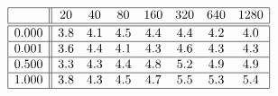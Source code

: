 \[
\begin{array}{|c||ccccccc|}
\hline 
& 20 & 40 & 80 & 160 & 320 & 640 & 1280\\
\hline \hline 
0.000 & 3.8 & 4.1 & 4.5 & 4.4 & 4.4 & 4.2 & 4.0 \\ \hline 
0.001 & 3.6 & 4.4 & 4.1 & 4.3 & 4.6 & 4.3 & 4.3 \\ \hline 
0.500 & 3.3 & 4.3 & 4.4 & 4.8 & 5.2 & 4.9 & 4.9 \\ \hline 
1.000 & 3.8 & 4.3 & 4.5 & 4.7 & 5.5 & 5.3 & 5.4 \\ \hline 
\end{array}
\]

